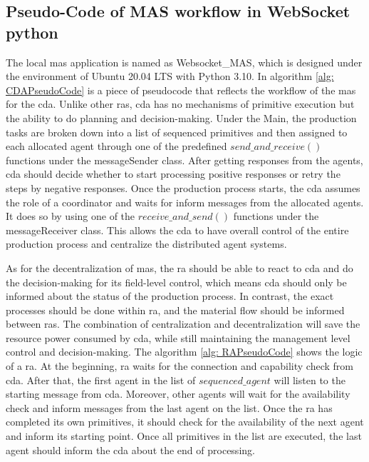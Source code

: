 \subsection{Pseudo-Code of MAS workflow in WebSocket python}\label{chap: Meth-WS-MAS}
The local \gls{mas} application is named as Websocket\_MAS, which is designed under the 
environment of Ubuntu 20.04 LTS with Python 3.10. 
In algorithm \ref{alg: CDAPseudoCode} is a piece of pseudocode that reflects the workflow of the \gls{mas} for the \gls{cda}. 
Unlike other \gls{ras}, \gls{cda} has no mechanisms of primitive execution but the ability to do planning and decision-making. 
Under the Main, the production tasks are broken down into a list of sequenced primitives and then assigned to each allocated agent through one of the predefined $send\_and\_receive()$ functions under the messageSender class.
After getting responses from the agents, \gls{cda} should decide whether to start processing positive responses or retry the steps by negative responses.  
Once the production process starts, the \gls{cda} assumes the role of a coordinator and waits for inform messages from the allocated agents. It does so by using one of the $receive\_and\_send()$ functions under the messageReceiver class. This allows the \gls{cda} to have overall control of the entire production process and centralize the distributed agent systems.


As for the decentralization of \gls{mas}, the \gls{ra} should be able to react to \gls{cda} and do the decision-making for its field-level control, which means \gls{cda} should only be informed about the status of the production process. In contrast, the exact processes should be done within \gls{ra}, and the material flow should be informed between \gls{ras}. The combination of centralization and decentralization will save the resource power consumed by \gls{cda}, 
while still maintaining the management level control and decision-making.  
The algorithm \ref{alg: RAPseudoCode} shows the logic of a \gls{ra}. At the beginning, \gls{ra} waits for the connection and capability check from \gls{cda}. After that, the first agent in the list of $sequenced\_agent$ will listen to the starting message from \gls{cda}. 
Moreover, other agents will wait for the availability check and inform messages from the last agent on the list. 
Once the \gls{ra} has completed its own primitives, it should check for the availability of the next agent and inform its starting point. 
Once all primitives in the list are executed, the last agent should inform the \gls{cda} about the end of processing.


